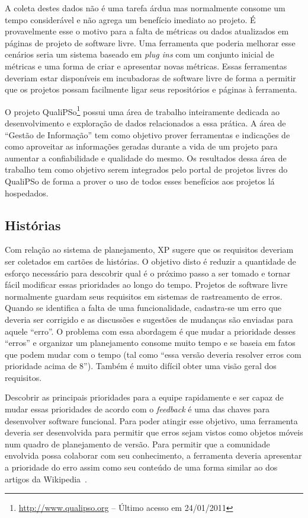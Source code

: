 A coleta destes dados não é uma tarefa árdua mas normalmente consome
um tempo considerável e não agrega um benefício imediato ao projeto. É
provavelmente esse o motivo para a falta de métricas ou dados
atualizados em páginas de projeto de software livre. Uma ferramenta
que poderia melhorar esse cenários seria um sistema baseado em
\emph{plug ins} com um conjunto inicial de métricas e uma forma de
criar e apresentar novas métricas. Essas ferramentas deveriam estar
disponíveis em incubadoras de software livre de forma a permitir que
os projetos possam facilmente ligar seus repositórios e páginas à
ferramenta.

O projeto QualiPSo\footnote{\url{http://www.qualipso.org} -- Último
  acesso em 24/01/2011} possui uma área de trabalho inteiramente
dedicada ao desenvolvimento e exploração de dados relacionados a essa
prática. A área de ``Gestão de Informação'' tem como objetivo prover
ferramentas e indicações de como aproveitar as informações geradas
durante a vida de um projeto para aumentar a confiabilidade e
qualidade do mesmo. Os resultados dessa área de trabalho tem como
objetivo serem integrados pelo portal de projetos livres do QualiPSo
de forma a prover o uso de todos esses benefícios aos projetos lá
hospedados.

\subsection{Histórias}
\label{subsec:stories}

Com relação ao sistema de planejamento, XP sugere que os requisitos
deveriam ser coletados em cartões de histórias. O objetivo disto é
reduzir a quantidade de esforço necessário para descobrir qual é o
próximo passo a ser tomado e tornar fácil modificar essas prioridades
ao longo do tempo. Projetos de software livre normalmente guardam seus
requisitos em sistemas de rastreamento de erros. Quando se identifica
a falta de uma funcionalidade, cadastra-se um erro que deveria ser
corrigido e as discussões e sugestões de mudanças são enviadas para
aquele ``erro''. O problema com essa abordagem é que mudar a
prioridade desses ``erros'' e organizar um planejamento consome muito
tempo e se baseia em fatos que podem mudar com o tempo (tal como
``essa versão deveria resolver erros com prioridade acima de
8''). Também é muito difícil obter uma visão geral dos requisitos.

Descobrir as principais prioridades para a equipe rapidamente e ser
capaz de mudar essas prioridades de acordo com o \emph{feedback} é uma
das chaves para desenvolver software funcional. Para poder atingir
esse objetivo, uma ferramenta deveria ser desenvolvida para permitir
que erros sejam vistos como objetos móveis num quadro de planejamento
de versão. Para permitir que a comunidade envolvida possa colaborar
com seu conhecimento, a ferramenta deveria apresentar a prioridade do
erro assim como seu conteúdo de uma forma similar ao dos artigos da
Wikipedia~\cite{Surowiecki2004,Tapscott2006,Benkler2006}.

